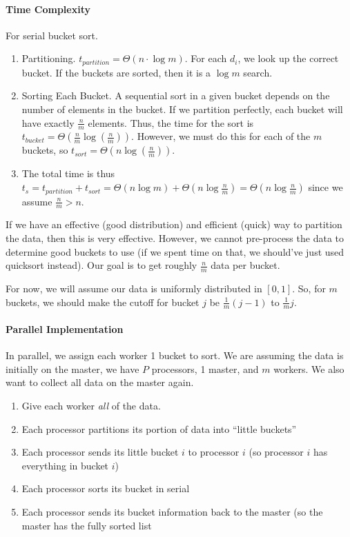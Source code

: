\documentclass[12pt]{article}
\numberwithin{equation}{section}
\theoremstyle{theorem}
\theoremstyle{definition}
\theoremstyle{remark}
\begin{document}
\paragraph{Time Complexity} For serial bucket sort. 
\begin{enumerate}
\item Partitioning. $t_{partition} = \Theta(n\cdot\log m)$.  For each $d_i$, we look up the correct bucket.  If the buckets are sorted, then it is a $\log m$ search.
\item Sorting Each Bucket.  A sequential sort in a given bucket depends on the number of elements in the bucket.  If we partition perfectly, each bucket will have exactly $\frac{n}{m}$ elements.  Thus, the time for the sort is $t_{bucket} = \Theta(\frac{n}{m}\log(\frac{n}{m}))$.  However, we must do this for each of the $m$ buckets, so $t_{sort} = \Theta(n\log(\frac{n}{m}))$.  
\item The total time is thus $t_s = t_{partition} + t_{sort} = \Theta(n\log m) + \Theta(n\log \frac{n}{m}) = \Theta(n\log\frac{n}{m})$ since we assume $\frac{n}{m} > n$.
\end{enumerate}
If we have an effective (good distribution) and efficient (quick) way to partition the data, then this is very effective.  However, we cannot pre-process the data to determine good buckets to use (if we spent time on that, we should've just used quicksort instead).  Our goal is to get roughly $\frac{n}{m}$ data per bucket.

For now, we will assume our data is uniformly distributed in $[0, 1]$.  So, for $m$ buckets, we should make the cutoff for bucket $j$ be $\frac{1}{m}(j-1)$ to $\frac{1}{m}j$. 

\paragraph{Parallel Implementation} In parallel, we assign each worker 1 bucket to sort.  We are assuming the data is initially on the master, we have $P$ processors, 1 master, and $m$ workers.  We also want to collect all data on the master again.
\begin{enumerate}
\item Give each worker \textit{all} of the data.  
\item Each processor partitions its portion of data into ``little buckets''
\item Each processor sends its little bucket $i$ to processor $i$ (so processor $i$ has everything in bucket $i$)
\item Each processor sorts its bucket in serial
\item Each processor sends its bucket information back to the master (so the master has the fully sorted list
\end{enumerate}
\end{document}
